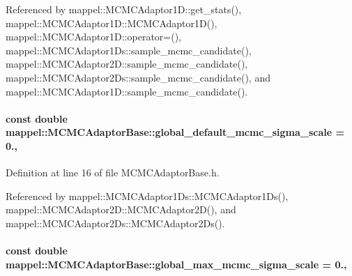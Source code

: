 Referenced by mappel\+::\+M\+C\+M\+C\+Adaptor1\+D\+::get\+\_\+stats(), mappel\+::\+M\+C\+M\+C\+Adaptor1\+D\+::\+M\+C\+M\+C\+Adaptor1\+D(), mappel\+::\+M\+C\+M\+C\+Adaptor1\+D\+::operator=(), mappel\+::\+M\+C\+M\+C\+Adaptor1\+Ds\+::sample\+\_\+mcmc\+\_\+candidate(), mappel\+::\+M\+C\+M\+C\+Adaptor2\+D\+::sample\+\_\+mcmc\+\_\+candidate(), mappel\+::\+M\+C\+M\+C\+Adaptor2\+Ds\+::sample\+\_\+mcmc\+\_\+candidate(), and mappel\+::\+M\+C\+M\+C\+Adaptor1\+D\+::sample\+\_\+mcmc\+\_\+candidate().

\paragraph[{\texorpdfstring{global\+\_\+default\+\_\+mcmc\+\_\+sigma\+\_\+scale}{global_default_mcmc_sigma_scale}}]{\setlength{\rightskip}{0pt plus 5cm}const double mappel\+::\+M\+C\+M\+C\+Adaptor\+Base\+::global\+\_\+default\+\_\+mcmc\+\_\+sigma\+\_\+scale = 0.\hspace{0.3cm}{\ttfamily [static]}, {\ttfamily [inherited]}}\hypertarget{classmappel_1_1MCMCAdaptorBase_a44cebca0e27135c854fa8430d2d89929}{}\label{classmappel_1_1MCMCAdaptorBase_a44cebca0e27135c854fa8430d2d89929}


Definition at line 16 of file M\+C\+M\+C\+Adaptor\+Base.\+h.



Referenced by mappel\+::\+M\+C\+M\+C\+Adaptor1\+Ds\+::\+M\+C\+M\+C\+Adaptor1\+Ds(), mappel\+::\+M\+C\+M\+C\+Adaptor2\+D\+::\+M\+C\+M\+C\+Adaptor2\+D(), and mappel\+::\+M\+C\+M\+C\+Adaptor2\+Ds\+::\+M\+C\+M\+C\+Adaptor2\+Ds().

\paragraph[{\texorpdfstring{global\+\_\+max\+\_\+mcmc\+\_\+sigma\+\_\+scale}{global_max_mcmc_sigma_scale}}]{\setlength{\rightskip}{0pt plus 5cm}const double mappel\+::\+M\+C\+M\+C\+Adaptor\+Base\+::global\+\_\+max\+\_\+mcmc\+\_\+sigma\+\_\+scale = 0.\hspace{0.3cm}{\ttfamily [static]}, {\ttfamily [inherited]}}\hypertarget{classmappel_1_1MCMCAdaptorBase_aebc93881ca351e67de867238a62579eb}{}\label{classmappel_1_1MCMCAdaptorBase_aebc93881ca351e67de867238a62579eb}


